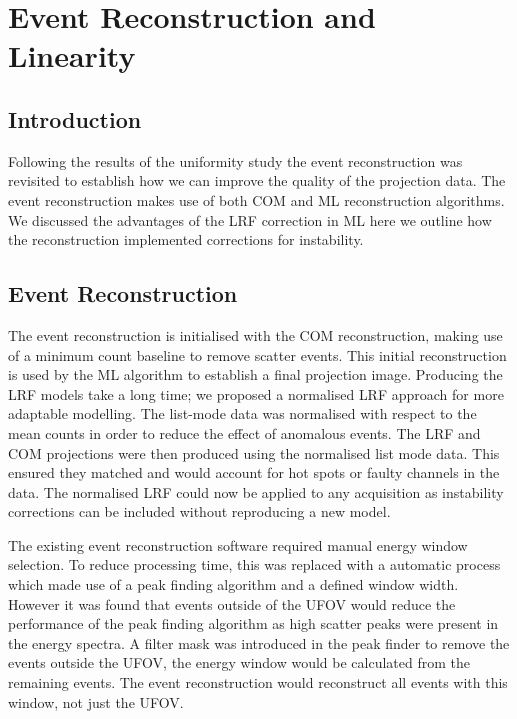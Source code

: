 \chapter{Event Reconstruction and Linearity}
\label{Linearity}

\section{Introduction}
Following the results of the uniformity study the event reconstruction was revisited to  establish how we can improve the quality of the projection data. The event reconstruction makes use of both \acrshort{COM} and \acrshort{ML} reconstruction algorithms. We discussed the advantages of the \acrshort{LRF} correction in \acrshort{ML} here we outline how the reconstruction implemented corrections for instability. 

\section{Event Reconstruction}
The event reconstruction is initialised with the \acrshort{COM} reconstruction, making use of a minimum count baseline to remove scatter events. This initial reconstruction is used by the \acrshort{ML} algorithm to establish a final projection image. Producing the \acrshort{LRF} models take a long time; we proposed a normalised \acrshort{LRF} approach for more adaptable modelling. The list-mode data was normalised with respect to the mean counts in order to reduce the effect of anomalous events. The \acrshort{LRF} and \acrshort{COM} projections were then produced using the normalised list mode data. This ensured they matched and would account for hot spots or faulty channels in the data. The normalised \acrshort{LRF} could now be applied to any acquisition as instability corrections can be included without reproducing a new model.

The existing event reconstruction software required manual energy window selection. To reduce processing time, this was replaced with a automatic process which made use of a peak finding algorithm and a defined window width. However it was found that events outside of the \acrshort{UFOV} would reduce the performance of the peak finding algorithm as high scatter peaks were present in the energy spectra. A filter mask was introduced in the peak finder to remove the events outside the \acrshort{UFOV}, the energy window would be calculated from the remaining events. The event reconstruction would reconstruct all events with this window, not just the \acrshort{UFOV}.

